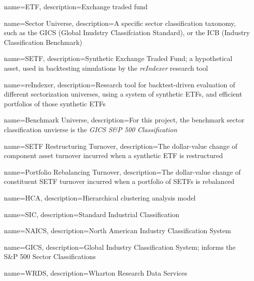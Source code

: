 \makeglossaries



{
    name=ETF,
    description={Exchange traded fund}
}


{
    name=Sector Universe,
    description={A specific sector classification taxonomy, such as the GICS (Global Inudstry Classifciation Standard), or the ICB (Industry Classification Benchmark)}
}

{
    name=SETF,
    description={Synthetic Exchange Traded Fund; a hypothetical asset, used in backtesting simulations by the \textit{reIndexer} research tool}
}

{
    name=reIndexer,
    description={Research tool for backtest-driven evaluation of different sectorization universes, using a system of synthetic ETFs, and efficient portfolios of those synthetic ETFs}
}

{
    name=Benchmark Universe,
    description={For this project, the benchmark sector classification unvierse is the \textit{GICS S\&P 500 Classification}}
}

{
    name=SETF Restructuring Turnover,
    description={The dollar-value change of component asset turnover incurred when a synthetic ETF is restructured}
}

{
    name=Portfolio Rebalancing Turnover,
    description={The dollar-value change of constituent SETF turnover incurred when a portfolio of SETFs is rebalanced}
}

{
    name=HCA,
    description={Hierarchical clustering analysis model}
}

{
    name=SIC,
    description={Standard Industrial Classification}
}

{
    name=NAICS,
    description={North American Industry Classification System}
}

{
    name=GICS,
    description={Global Industry Classification System; informs the S\&P 500 Sector Classifications}
}

{
    name=WRDS,
    description={Wharton Research Data Services}
}